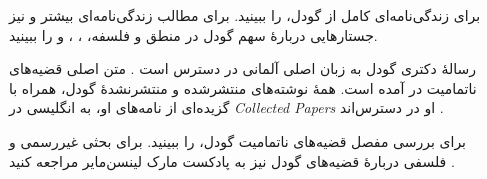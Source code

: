 \documentclass[../../../include/open-logic-section]{subfiles}
\begin{document}
\begin{reading}
برای زندگی‌نامه‌ای کامل از گودل، \citet{Dawson1997} را ببینید. برای
مطالب زندگی‌نامه‌ای بیشتر و نیز جستارهایی دربارهٔ سهم گودل در منطق و
فلسفه، \citet{Wang1990}، \citet{Baaz2011}، \citet{Takeuti2003} و
\citet{Sigmund2007} را ببینید.

رسالهٔ دکتری گودل به زبان اصلی آلمانی در دسترس است
\citep{Godel1929}. متن اصلی قضیه‌های ناتمامیت در \citep{Godel1931}
آمده است. همهٔ نوشته‌های منتشرشده و منتشرنشدهٔ گودل، همراه با گزیده‌ای
از نامه‌های او، به انگلیسی در \emph{Collected Papers} او در دسترس‌اند
\citet{Godel1986,Godel1990}.

برای بررسی مفصل قضیه‌های ناتمامیت گودل، \citet{Smith2013} را ببینید.
برای بحثی غیررسمی و فلسفی دربارهٔ قضیه‌های گودل نیز به پادکست مارک
لینسن‌مایر مراجعه کنید \citep{Linsenmayer2014}.
\end{reading}
\end{document}
